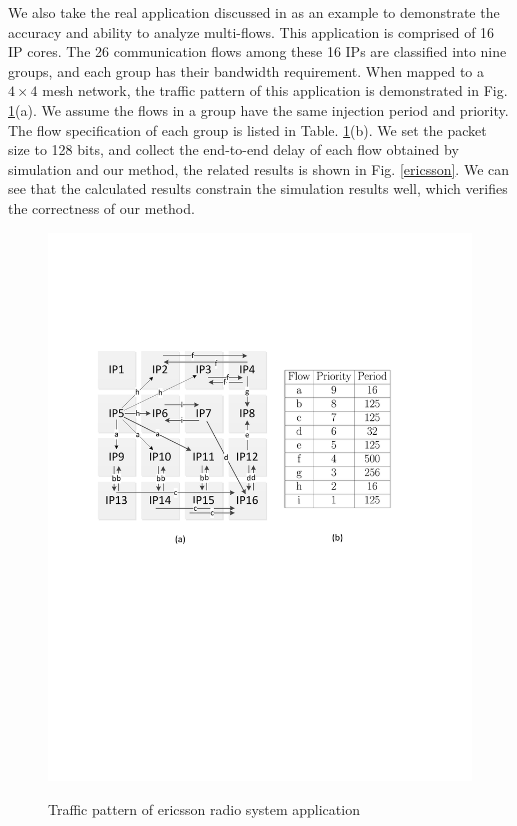 \documentclass[10pt,journal]{IEEEtran}
\begin{document}
We also take the real application discussed in \cite{LuJa08}\cite{Jafari1922089} as an example to demonstrate the accuracy and ability to analyze multi-flows. This application is comprised of 16 IP cores. The 26 communication flows among these 16 IPs are classified into nine groups, and each group has their bandwidth requirement. When mapped to a $4\times 4$ mesh network, the traffic pattern of this application is demonstrated in Fig. \ref{trafficpattern}(a). We assume the flows in a group have the same injection period and priority. The flow specification of each group is listed in Table. \ref{trafficpattern}(b). We set the packet size to 128 bits, and collect the end-to-end delay of each flow obtained by simulation and our method, the related results is shown in Fig. \ref{ericsson}. We can see that the calculated results constrain the simulation results well, which verifies the correctness of our method.
\begin{figure}
  \centering
  \includegraphics[scale=0.5]{figures/trafficpattern.pdf}\\
  \caption{Traffic pattern of ericsson radio system application}\label{trafficpattern}
\end{figure}
\end{document}

